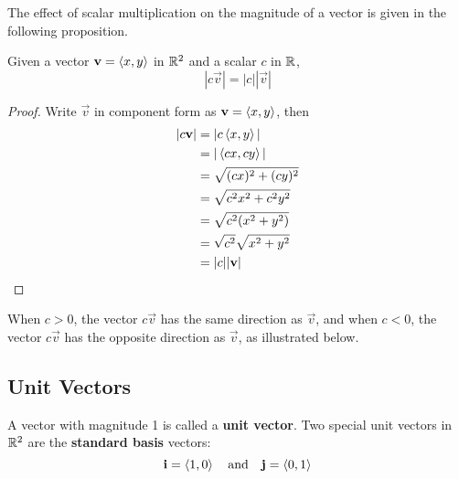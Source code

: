 \documentclass[handout]{ximera}
\begin{document}
The effect of scalar multiplication on the magnitude of a vector is given in the following proposition.
\begin{proposition}[Scaling]
Given a vector $\mathbf{v} = \left\langle x,y\right\rangle$ in $\mathbb R^2$ and a scalar $c$ in $\mathbb R$,
\[
|c\vec{v}| = |c| |\vec{v}|
\]
\begin{proof}
Write $\vec{v}$ in component form as $\mathbf{v} = \left\langle x,y\right\rangle$, then
\begin{align*}
|c\mathbf{v}| &= |c\left\langle x,y\right\rangle|\\
            &= |\left\langle cx,cy\right\rangle|\\
            &= \sqrt{(cx)^2 + (cy)^2}\\
            &= \sqrt{c^2x^2 + c^2y^2}\\
            &= \sqrt{c^2(x^2 + y^2)}\\
            &= \sqrt{c^2} \sqrt{x^2 + y^2}\\
            &= |c| |\mathbf{v}|
\end{align*}
\end{proof}
\end{proposition}

When $c>0$, the vector $c\vec{v}$ has the same direction as $\vec{v}$, and when $c<0$, the
vector $c\vec{v}$ has the opposite direction as $\vec{v}$, as illustrated below.



\begin{image}
\end{image}

\subsection{Unit Vectors}

A vector with magnitude 1 is called a {\bf unit vector}. Two special unit vectors in $\mathbb R^2$ are the {\bf standard basis} vectors:
\[
\mathbf{i} = \left\langle 1,0\right\rangle \quad \text{and} \quad \mathbf{j} = \left\langle 0,1\right\rangle
\]
\end{document}
